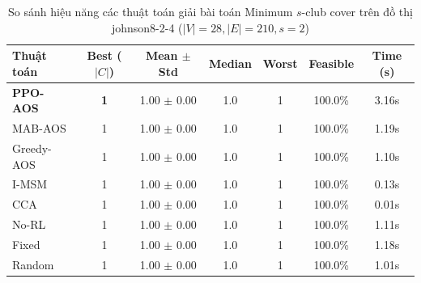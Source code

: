 \begin{table}[htbp]
\centering
\caption{So sánh hiệu năng các thuật toán giải bài toán Minimum $s$-club cover trên đồ thị johnson8-2-4 ($|V|=28, |E|=210, s=2$)}
\label{tab:results_johnson8_2_4}
\begin{tabular}{lcccccc}
\hline
\textbf{Thuật toán} & \textbf{Best ($|C|$)} & \textbf{Mean $\pm$ Std} & \textbf{Median} & \textbf{Worst} & \textbf{Feasible} & \textbf{Time (s)} \\
\hline
\textbf{PPO-AOS} & \textbf{1} & 1.00 $\pm$ 0.00 & 1.0 & 1 & 100.0\% & 3.16s \\
MAB-AOS & 1 & 1.00 $\pm$ 0.00 & 1.0 & 1 & 100.0\% & 1.19s \\
Greedy-AOS & 1 & 1.00 $\pm$ 0.00 & 1.0 & 1 & 100.0\% & 1.10s \\
I-MSM & 1 & 1.00 $\pm$ 0.00 & 1.0 & 1 & 100.0\% & 0.13s \\
CCA & 1 & 1.00 $\pm$ 0.00 & 1.0 & 1 & 100.0\% & 0.01s \\
No-RL & 1 & 1.00 $\pm$ 0.00 & 1.0 & 1 & 100.0\% & 1.11s \\
Fixed & 1 & 1.00 $\pm$ 0.00 & 1.0 & 1 & 100.0\% & 1.18s \\
Random & 1 & 1.00 $\pm$ 0.00 & 1.0 & 1 & 100.0\% & 1.01s \\
\hline
\end{tabular}
\end{table}
